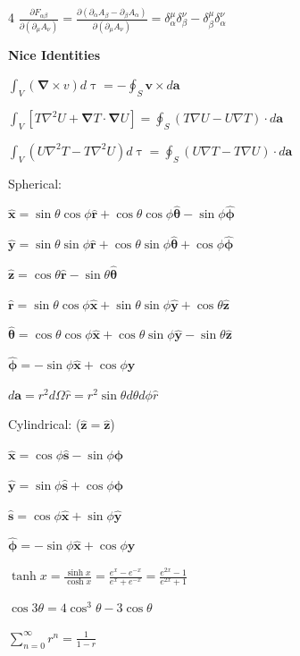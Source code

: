 \documentclass[a4paper,twoside]{article}
\newcommand{\secblock}[1]{%
\par\vspace{1.8pt}%
\noindent\colorbox{hdrcol}{\parbox[c][1.0em][c]{0.98\linewidth}{\color{white}\bfseries\small #1}}\par
\vspace{1pt}%
}
\begin{document}
\begin{multicols*}{4}
\(\frac{\partial F_{\alpha\beta}}{\partial(\partial_\mu A_\nu)} = \frac{\partial(\partial_\alpha A_\beta - \partial_\beta A_\alpha)}{\partial(\partial_\mu A_\nu)} = \delta^\mu_\alpha \delta^\nu_\beta - \delta^\mu_\beta \delta^\nu_\alpha\)



\secblock{Nice Identities}
\(\int_V (\bm \nabla \times v) d \uptau = - \oint_S \bm v \times d \bm a\)

\(\int_V [T \nabla^2 U + \bm \nabla T \cdot \bm \nabla U] = \oint_S (T \nabla U - U \nabla T) \cdot d \bm a\)

\(\int_V (U \nabla^2 T - T \nabla^2 U) d \uptau = \oint_S (U \nabla T - T \nabla U) \cdot d \bm a\)

Spherical:

\(\hat{\bm x} = \sin \theta \cos \phi \hat{\bm r} + \cos \theta \cos \phi \hat{\bm \theta}-\sin \phi \hat{\bm \phi}\)

\(\hat{\bm y} = \sin\theta \sin \phi \hat{\bm r} + \cos\theta \sin \phi \hat{\bm \theta} + \cos \phi \hat{\bm \phi}\)

\(\hat{\bm z} = \cos \theta \hat{\bm r} - \sin \theta \hat{\bm \theta}\)

\(\hat{\bm{r}} = \sin\theta \cos \phi \hat{\bm x} + \sin \theta \sin \phi \hat{\bm y}+\cos \theta \hat{\bm z}\)

\(\hat{\bm \theta} = \cos\theta\cos\phi \hat{\bm x} + \cos\theta\sin\phi \hat{\bm y} - \sin\theta \hat{\bm z}\)

\(\hat{\bm \phi} = -\sin\phi \hat{\bm x} + \cos\phi \hat{\bm y}\)

\(d \bm a = r^2 d \Omega \hat{r} = r^2 \sin \theta d\theta d\phi \hat{r}\)

Cylindrical: (\(\hat{\bm z} = \hat{\bm z}\))

\(\hat{\bm x} = \cos \phi \hat{\bm s} - \sin \phi \hat{\bm \phi}\)

\(\hat{\bm y} = \sin \phi \hat{\bm s} + \cos \phi \hat{\bm \phi}\)



\(\hat{\bm s} = \cos \phi \hat{\bm x} + \sin \phi \hat{\bm y}\)

\(\hat{\bm \phi} = -\sin \phi \hat{\bm x} + \cos \phi \hat{\bm y}\)


\(\tanh x = \frac{\sinh x}{\cosh x} = \frac{e^x - e^{-x}}{e^x + e^{-x}} = \frac{e^{2x} -1}{e^{2x} + 1}\)

\(\cos 3 \theta = 4 \cos^3 \theta - 3 \cos \theta\)


\(\sum_{n=0}^{\infty} r^n = \frac{1}{1-r}\)



\end{multicols*}
\end{document}
